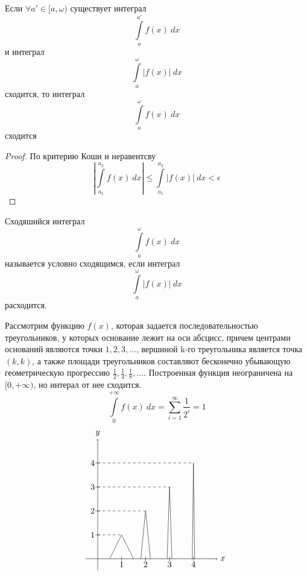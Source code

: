 \begin{statement}
    Если $\forall a'\in [a, \omega)$ существует интеграл
    \[\int\limits_{a}^{a'}f(x)\ dx\]
    и интеграл
    \[\int\limits_{a}^{\omega}|f(x)|\ dx\]
    сходится, то интеграл
    \[\int\limits_{a}^{\omega}f(x)\ dx\]
    сходится
\end{statement} 
\begin{proof}
    По критерию Коши и неравентсву
    \[\left|\int\limits_{a_1}^{a_2}f(x)\ dx\right|\leq \int\limits_{a_1}^{a_2}|f(x)|\ dx<\epsilon\]
\end{proof} 
\begin{definition}
    Сходяшийся интеграл 
    \[\int\limits_{a}^{\omega}f(x)\ dx\]
    называется условно сходящимся, если интеграл 
    \[\int\limits_{a}^{\omega}|f(x)|\ dx\]
    расходится.
\end{definition} 
\begin{example} Рассмотрим функцию $f(x)$, которая задается последовательностью треугольников, у которых основание лежит на оси абсцисс, причем центрами оснований являются точки $1,2,3,\dots$, вершиной k-го треугольника является точка $(k,k)$, а также площади треугольников составляют бесконечно убывающую геометрическую прогрессию $\frac{1}{2}, \frac{1}{4}, \frac{1}{8}, \dots$. Построенная функция неограничена на $[0,+\infty)$, но интерал от нее сходится.
    \[\int\limits_{0}^{+\infty}f(x)\ dx=\sum\limits_{i=1}^{\infty}\frac{1}{2^i}=1\] 
    \newpage
    \[
    \begin{tikzpicture}[scale=1]
        \draw[->] (-0.5, 0) -- (5, 0) node[right] {$x$};
        \draw[->] (0, -0.5) -- (0, 5) node[above] {$y$};
    
        \foreach \x in {1, 2, 3, 4} {
            \draw (\x, 0) node[below] {\x};
            \draw (\x, 0.1) -- (\x, -0.1);
        }
    
        \foreach \y in {1, 2, 3, 4} {
            \draw (0, \y) node[left] {\y};
            \draw (0.1, \y) -- (-0.1, \y);
        }

        \draw[-] (0.5, 0) -- (1, 1);
        \draw[-] (1, 1) -- (1.5, 0);

        \draw[-] (1.8, 0) -- (2, 2);
        \draw[-] (2, 2) -- (2.2, 0);

        \draw[-] (2.9, 0) -- (3, 3);
        \draw[-] (3, 3) -- (3.1, 0);

        \draw[-] (3.95, 0) -- (4, 4);
        \draw[-] (4, 4) -- (4.05, 0);

        \draw[dashed] (0, 1) -- (1, 1);
        \draw[dashed] (0, 2) -- (2, 2);
        \draw[dashed] (0, 3) -- (3, 3);
        \draw[dashed] (0, 4) -- (4, 4);
    \end{tikzpicture}
\]
\end{example}
